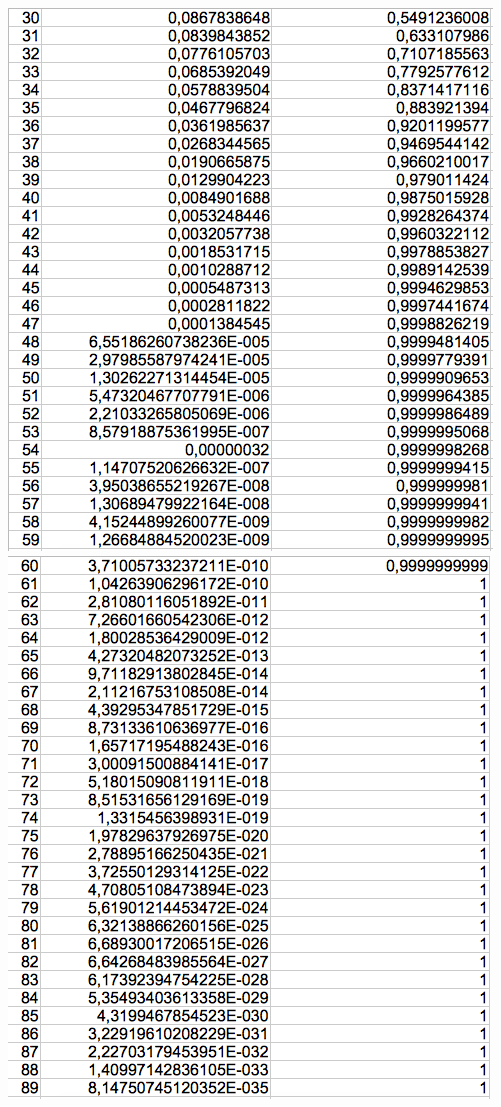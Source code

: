 \begin{enumerate}
\center \includegraphics[scale=0.5]{chapp11_ill2.png} \flushleft
\center \includegraphics[scale=0.5]{chapp11_ill3.png} \flushleft

\end{enumerate}
